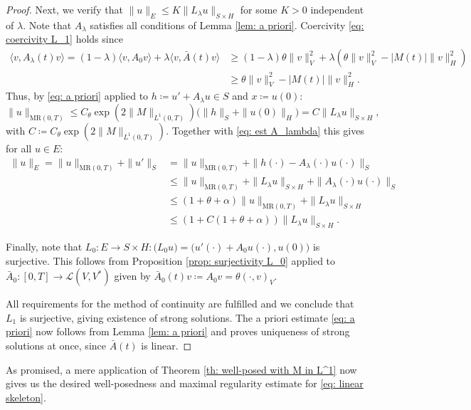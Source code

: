 \documentclass{amsart}
\renewcommand{\MR}{\mathrm{MR}}
\newcommand{\<}{\langle}
\newcommand{\?}{\rangle}
\theoremstyle{plain}
\theoremstyle{remark}
\theoremstyle{plain}
\numberwithin{equation}{section}
\begin{document}
\begin{proof}
Next, we verify that $\|u\|_E\leq K\|L_\lambda u\|_{S\times H}$ for some $K>0$ independent of $\lambda$.
Note that $A_\lambda$ satisfies all conditions of Lemma \ref{lem: a priori}. Coercivity \eqref{eq: coercivity L_1} holds since
\begin{align*}
\<v,A_\lambda(t)v\?=(1-\lambda)\<v,{A}_0v\?+\lambda\<v,\bar{A}(t)v\?&\geq (1-\lambda)\theta\|v\|_V^2+\lambda (\theta \|v\|_V^2-|M(t)|\|v\|_H^2)\\
&\geq\theta\|v\|_V^2-|M(t)|\|v\|_H^2.
\end{align*}
Thus, by \eqref{eq: a priori} applied to $h\coloneqq u'+A_\lambda u\in S$ and $x\coloneqq u(0)$:
\[
\|u\|_{\MR(0,T)}\leq C_\theta\exp(2\|M\|_{L^1(0,T)})\big(\|h\|_S+\|u(0)\|_H\big)=C\|L_\lambda u\|_{S\times H},
\]
with $C\coloneqq C_\theta\exp(2\|M\|_{L^1(0,T)})$. Together with \eqref{eq: est A_lambda} this gives for all $u\in E$:
\begin{align*}
  \|u\|_E =\|u\|_{\MR(0,T)}+\|u'\|_S &=\|u\|_{\MR(0,T)}+\|h(\cdot)-A_\lambda(\cdot)u(\cdot)\|_S\\
  &\leq \|u\|_{\MR(0,T)}+\|L_\lambda u\|_{S\times H}+\|A_\lambda(\cdot)u(\cdot)\|_S\\
   &\leq (1+\theta+\alpha)\|u\|_{\MR(0,T)}+\|L_\lambda u\|_{S\times H}\\
   &\leq (1+C(1+\theta+\alpha))\|L_\lambda u\|_{S\times H}.
\end{align*}

Finally, note that $L_0\colon E\to S\times H: \big(L_0u\big)=\big(u'(\cdot)+A_0u(\cdot),u(0)\big)$ is surjective. This follows from Proposition \ref{prop: surjectivity L_0} applied to $\bar{A}_0\colon [0,T]\to \mathcal{L}(V,V^*)$ given by $\bar{A}_0(t)v\coloneqq A_0v= \theta(\cdot,v)_{V}$.

All requirements for the method of continuity are fulfilled and we conclude that $L_1$ is surjective, giving existence of strong solutions. The a priori estimate \eqref{eq: a priori} now follows from Lemma \ref{lem: a priori} and proves uniqueness of strong solutions at once, since $\bar{A}(t)$ is linear.
\end{proof}

As promised, a mere application of Theorem \ref{th: well-posed with M in L^1} now gives us the desired well-posedness and maximal regularity estimate for \eqref{eq: linear skeleton}.
\end{document}
